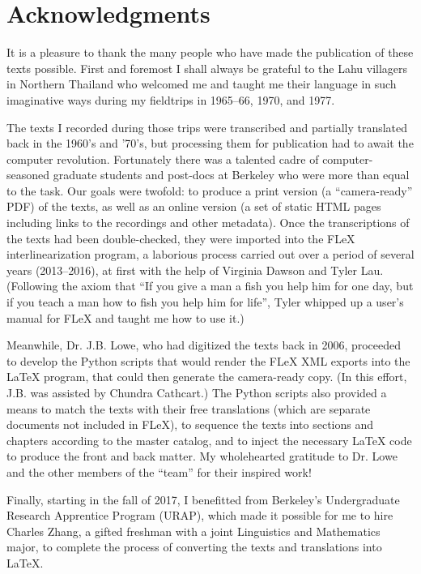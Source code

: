 \vspace{0.25em}

\renewcommand{\thefootnote}{\arabic{footnote}}
\setcounter{footnote}{0}

\section*{Acknowledgments}
It is a pleasure to thank the many people who have made the publication
of these texts possible. First and foremost I shall always be grateful
to the Lahu villagers in Northern Thailand who welcomed me and taught me
their language in such imaginative ways during my fieldtrips in 1965--66,
1970, and 1977.

The texts I recorded during those trips were transcribed and partially
translated back in the 1960's and '70's, but processing them for
publication had to await the computer revolution. Fortunately there
was a talented cadre of computer-seasoned graduate students and
post-docs at Berkeley who were more than equal to the task. Our goals
were twofold: to produce a print version (a ``camera-ready'' PDF) of
the texts, as well as an online version (a set of static HTML pages
including links to the recordings and other metadata). Once the
transcriptions of the texts had been double-checked, they were
imported into the FLeX interlinearization program, a laborious process
carried out over a period of several years (2013--2016), at first with
the help of Virginia Dawson and Tyler Lau.  (Following the axiom that
``If you give a man a fish you help him for one day, but if you teach
a man how to fish you help him for life'', Tyler whipped up a user's
manual for FLeX and taught me how to use it.)

Meanwhile, Dr. J.B. Lowe, who had digitized the texts back in 2006,
proceeded to develop the Python scripts that would render the FLeX XML
exports into the LaTeX program, that could then generate the
camera-ready copy. (In this effort, J.B. was assisted by Chundra
Cathcart.) The Python scripts also provided a means to match the texts
with their free translations (which are separate documents not included
in FLeX), to sequence the texts into sections and chapters according to
the master catalog, and to inject the necessary LaTeX code to produce
the front and back matter. My wholehearted gratitude to Dr. Lowe and the
other members of the ``team'' for their inspired work!

Finally, starting in the fall of 2017, I benefitted from Berkeley's
Undergraduate Research Apprentice Program (URAP), which made it possible
for me to hire Charles Zhang, a gifted freshman with a joint Linguistics
and Mathematics major, to complete the process of converting the
texts and translations into LaTeX.

